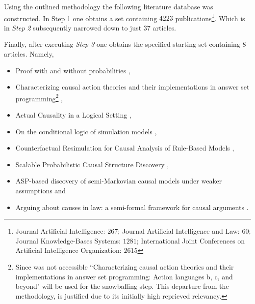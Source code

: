 \documentclass[11pt,a4paper]{book}
\theoremstyle{definition}
\theoremstyle{definition}
\theoremstyle{definition}
\theoremstyle{remark}
\begin{document}
Using the outlined methodology the following literature database was constructed. 
In Step 1 one obtains a set containing $4223$ publications\footnote{Journal Artificial Intelligence: $267$; Journal Artificial Intelligence and Law:  $60$; Journal Knowledge-Bases Systems: $1281$; International Joint Conferences on Artificial Intelligence Organization: $2615$}. 
Which is in \emph{Step 2} subsequently narrowed down to just $37$ articles\parencite{van2019separators,verheij2017proof,chen2019judicial,neil2019modelling,li2019context,lu2018mining,zhang2018collective,
constantinou2017towards,liang2017evaluation,zhang2017characterizing,mu2018measuring,kronegger2019backdoors,hyttinen2017core,
zhang2017transfer,zhang2017causal,liu2017cause,summerville2017charda,zhang2016causal,albrecht2016exploiting,chai2018language,
bochman2018actual,ibeling2018conditional,laurent2018counterfactual,chikahara2018causal,zhang2017achieving,backstrom2018novel,
jaber2018graphical,sridhar2018scalable,wenjuan2018mixed,xu2019achieving,zhang2019asp,Cai2019CausalDW,Sridhar2019EstimatingCE,
xie2019boosting,hassanzadeh2019answering,shankar2019three,Liepina2019ArguingAC}.


Finally, after executing \emph{Step 3} one obtains the specified starting set containing $8$ articles. Namely,
\begin{itemize}
\item Proof with and without probabilities \parencite{verheij2017proof},
\item Characterizing causal action theories and their implementations in answer set programming\footnote{Since \parencite{zhang2017characterizing} was not accessible ``Characterizing causal action theories and their implementations in answer set programming: Action languages b, c, and beyond" \parencite{zhang2015characterizing} will be used for the snowballing step. This departure from the methodology, is justified due to its initially high reprieved relevancy.}  \parencite{zhang2017characterizing},
\item Actual Causality in a Logical Setting \parencite{bochman2018actual},
\item On the conditional logic of simulation models \parencite{ibeling2018conditional},
\item  Counterfactual Resimulation for Causal Analysis of Rule-Based Models \parencite{laurent2018counterfactual},
\item Scalable Probabilistic Causal Structure Discovery \parencite{sridhar2018scalable},
\item  ASP-based discovery of semi-Markovian causal models under weaker assumptions \parencite{zhang2019asp} and 
\item Arguing about causes in law: a semi-formal framework for causal arguments \parencite{Liepina2019ArguingAC}.
\end{itemize}
\end{document}
